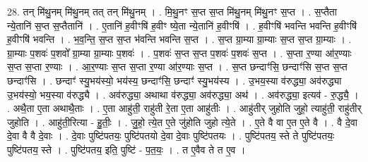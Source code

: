 \documentclass[17pt]{extarticle}
\begin{document}
28. तन् मि॑थु॒नम् मि॑थु॒नम् तत् तन् मि॑थु॒नम् । . मि॒थु॒नꣳ स॒प्त स॒प्त मि॑थु॒नम् मि॑थु॒नꣳ स॒प्त । . स॒प्तैता न्ये॒तानि॑ स॒प्त स॒प्तैतानि॑ । . ए॒तानि॑ ह॒वीꣳषि॑ ह॒वीꣳ ष्ये॒ता न्ये॒तानि॑ ह॒वीꣳषि॑ । . ह॒वीꣳषि॑ भवन्ति भवन्ति ह॒वीꣳषि॑ ह॒वीꣳषि॑ भवन्ति । . भ॒व॒न्ति॒ स॒प्त स॒प्त भ॑वन्ति भवन्ति स॒प्त । . स॒प्त ग्रा॒म्या ग्रा॒म्याः स॒प्त स॒प्त ग्रा॒म्याः । . ग्रा॒म्याः प॒शवः॑ प॒शवो᳚ ग्रा॒म्या ग्रा॒म्याः प॒शवः॑ । . प॒शवः॑ स॒प्त स॒प्त प॒शवः॑ प॒शवः॑ स॒प्त । . स॒प्ता र॒ण्या आ॑र॒ण्याः स॒प्त स॒प्ता र॒ण्याः । . आ॒र॒ण्याः स॒प्त स॒प्ता र॒ण्या आ॑र॒ण्याः स॒प्त । . स॒प्त छन्दाꣳ॑सि॒ छन्दाꣳ॑सि स॒प्त स॒प्त छन्दाꣳ॑सि । . छन्दाꣳ॑ स्यु॒भय॑स्यो॒ भय॑स्य॒ छन्दाꣳ॑सि॒ छन्दाꣳ॑ स्यु॒भय॑स्य । . उ॒भय॒स्या व॑रुद्ध्या॒ अव॑रुद्ध्या उ॒भय॑स्यो॒ भय॒स्या व॑रुद्ध्यै । . अव॑रुद्ध्या॒ अथाथा व॑रुद्ध्या॒ अव॑रुद्ध्या॒ अथ॑ । . अव॑रुद्ध्या॒ इत्यव॑ - रु॒द्ध्यै॒ । . अथै॒ता ए॒ता अथाथै॒ताः । . ए॒ता आहु॑ती॒ राहु॑ती रे॒ता ए॒ता आहु॑तीः । . आहु॑तीर् जुहोति जुहो॒ त्याहु॑ती॒ राहु॑तीर् जुहोति । . आहु॑ती॒रित्या - हु॒तीः॒ । . जु॒हो॒ त्ये॒त ए॒ते जु॑होति जुहो त्ये॒ते । . ए॒ते वै वा ए॒त ए॒ते वै । . वै दे॒वा दे॒वा वै वै दे॒वाः । . दे॒वाः पुष्टि॑पतयः॒ पुष्टि॑पतयो दे॒वा दे॒वाः पुष्टि॑पतयः । . पुष्टि॑पतय॒ स्ते ते पुष्टि॑पतयः॒ पुष्टि॑पतय॒ स्ते । . पुष्टि॑पतय॒ इति॒ पुष्टि॑ - प॒त॒यः॒ । . त ए॒वैव ते त ए॒व । \newline
\end{document}
